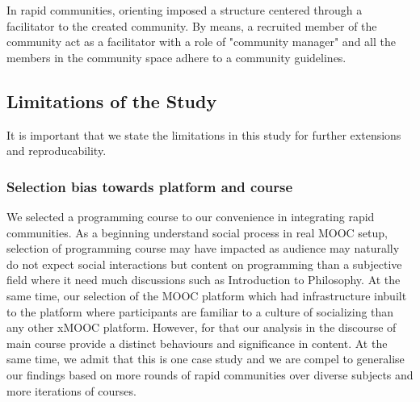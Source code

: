 \documentclass[manuscript,screen,review]{acmart}
\begin{document}
In rapid communities, orienting imposed a structure centered through a facilitator to the created community. By means, a recruited member of the community act as a facilitator with a role of "community manager" and all the members in the community space adhere to a community guidelines. 

\subsection{Limitations of the Study}
It is important that we state the limitations in this study for further extensions and reproducability.  
\subsubsection{Selection bias towards platform and course} 
We selected a programming course to our convenience in integrating rapid communities. As a  beginning understand social process in real MOOC setup, selection of programming course may  have impacted as audience may naturally do not expect social interactions but content on programming than a subjective field where it need much discussions such as Introduction to Philosophy. At the same time, our selection of the MOOC platform which had infrastructure inbuilt to the platform where participants are familiar to a culture of  socializing than any other xMOOC platform. However, for that our analysis in the discourse of main course provide a distinct behaviours and significance in content. At the same time, we admit that this is one case study and we are compel to generalise our findings based on more rounds of rapid communities over diverse subjects and more iterations of courses. 
\end{document}
